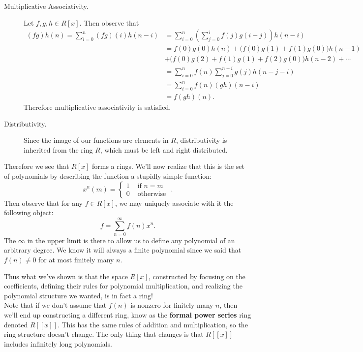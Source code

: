 \documentclass[12pt,letterpaper]{algebra_book}
\theoremstyle{definition}
\begin{document}
\begin{description}
        \item[Multiplicative Associativity.]
        Let $f, g, h \in R[x]$. Then observe that 
        \begin{align*}
            (fg)h(n) = \sum_{i = 0}^{n}(fg)(i)h(n - i) &= 
            \sum_{i = 0}^{n}\left( \sum_{j = 0}^{i}f(j)g(i - j) \right)h(n - i)\\
            &= f(0)g(0)h(n) + \Big(f(0)g(1) + f(1)g(0)\Big)h(n-1)\\ 
            &+ \Big(f(0)g(2) + f(1)g(1) + f(2)g(0)\Big)h(n-2) + \cdots \\
            &= \sum_{i = 0}^{n}f(n)\sum_{j = 0}^{n-i}g(j)h(n-j-i)\\
            &= \sum_{i = 0}^{n}f(n)(gh)(n - i)\\
            &= f(gh)(n).
        \end{align*}
        Therefore multiplicative associativity is satisfied.
        
        \item[Distributivity.] 
        Since the image of our functions are elements in $R$, distributivity is inherited from the ring $R$, which must
        be left and right distributed. 
    \end{description}

    Therefore we see that $R[x]$ forms a rings. We'll now realize
    that this is the set of polynomials by describing the function
    a stupidly simple function: 
    \[
        x^n(m) = 
        \begin{cases}
            1 & \text{ if } n = m\\
            0 & \text{ otherwise }
        \end{cases}.
    \]
    Then observe that for any $f \in R[x]$, we may uniquely associate
    with it the following object: 
    \[
        f = \sum_{n = 0}^{\infty}f(n)x^n.
    \]
    The $\infty$ in the upper limit is there to allow us to define
    any polynomial of an arbitrary degree. We know it will always
    a finite polynomial since we said that $f(n) \ne 0$ for at
    most finitely many $n$. 

    Thus what we've shown is that the space $R[x]$, constructed by
    focusing on the coefficients, defining their rules for
    polynomial multiplication, and realizing the polynomial
    structure we wanted, is in fact a ring!
    \\

    Note that if we don't assume that $f(n)$ is nonzero for
    finitely many $n$, then we'll end up constructing a different
    ring, know as the \textbf{formal power series} ring denoted $R[[x]]$. This has
    the same rules of addition and multiplication, so the ring
    structure doesn't change. The only thing that changes is that
    $R[[x]]$ includes infinitely long polynomials. 
\end{document}
